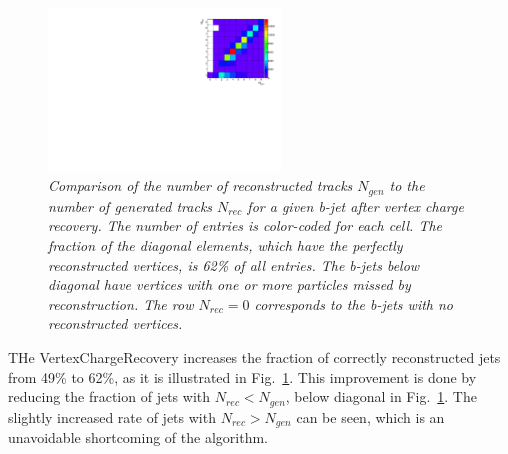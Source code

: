 \begin{figure}[h]
{\centering
    \includegraphics[width=0.55\textwidth]{ILD/plots/recovery-table.pdf}
    \caption{\sl Comparison of the number of reconstructed tracks $N_{gen}$ to the number of generated tracks $N_{rec}$ for a given b-jet after vertex charge recovery. The number of entries is color-coded for each cell. The fraction of the diagonal elements, which have the perfectly reconstructed vertices, is 62\% of all entries. The b-jets below diagonal have vertices with one or more particles missed by reconstruction. The row $N_{rec} = 0$ corresponds to the b-jets with no reconstructed vertices. %
    }
    \label{fig:RecoveryTable_3}
  }
\end{figure}


THe VertexChargeRecovery increases the fraction of correctly reconstructed jets from 49\% to 62\%, as it is illustrated in Fig.~\ref{fig:RecoveryTable_3}. 
This improvement is done by reducing the fraction of jets with $N_{rec} < N_{gen}$, below diagonal in Fig.~\ref{fig:RecoveryTable_3}. 
The slightly increased rate of jets with $N_{rec} > N_{gen}$ can be seen, which is an unavoidable shortcoming of the algorithm. 



